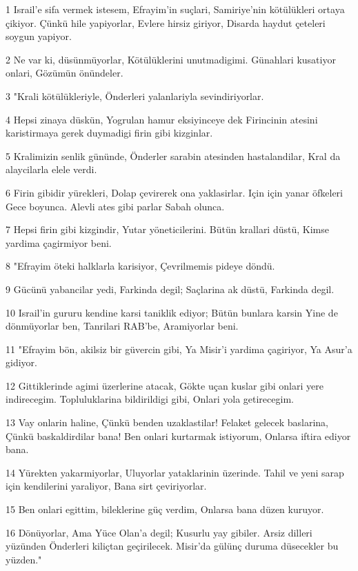 \par 1 Israil'e sifa vermek istesem, Efrayim'in suçlari, Samiriye'nin kötülükleri ortaya çikiyor. Çünkü hile yapiyorlar, Evlere hirsiz giriyor, Disarda haydut çeteleri soygun yapiyor.
\par 2 Ne var ki, düsünmüyorlar, Kötülüklerini unutmadigimi. Günahlari kusatiyor onlari, Gözümün önündeler.
\par 3 "Krali kötülükleriyle, Önderleri yalanlariyla sevindiriyorlar.
\par 4 Hepsi zinaya düskün, Yogrulan hamur eksiyinceye dek Firincinin atesini karistirmaya gerek duymadigi firin gibi kizginlar.
\par 5 Kralimizin senlik gününde, Önderler sarabin atesinden hastalandilar, Kral da alaycilarla elele verdi.
\par 6 Firin gibidir yürekleri, Dolap çevirerek ona yaklasirlar. Için için yanar öfkeleri Gece boyunca. Alevli ates gibi parlar Sabah olunca.
\par 7 Hepsi firin gibi kizgindir, Yutar yöneticilerini. Bütün krallari düstü, Kimse yardima çagirmiyor beni.
\par 8 "Efrayim öteki halklarla karisiyor, Çevrilmemis pideye döndü.
\par 9 Gücünü yabancilar yedi, Farkinda degil; Saçlarina ak düstü, Farkinda degil.
\par 10 Israil'in gururu kendine karsi taniklik ediyor; Bütün bunlara karsin Yine de dönmüyorlar ben, Tanrilari RAB'be, Aramiyorlar beni.
\par 11 "Efrayim bön, akilsiz bir güvercin gibi, Ya Misir'i yardima çagiriyor, Ya Asur'a gidiyor.
\par 12 Gittiklerinde agimi üzerlerine atacak, Gökte uçan kuslar gibi onlari yere indirecegim. Topluluklarina bildirildigi gibi, Onlari yola getirecegim.
\par 13 Vay onlarin haline, Çünkü benden uzaklastilar! Felaket gelecek baslarina, Çünkü baskaldirdilar bana! Ben onlari kurtarmak istiyorum, Onlarsa iftira ediyor bana.
\par 14 Yürekten yakarmiyorlar, Uluyorlar yataklarinin üzerinde. Tahil ve yeni sarap için kendilerini yaraliyor, Bana sirt çeviriyorlar.
\par 15 Ben onlari egittim, bileklerine güç verdim, Onlarsa bana düzen kuruyor.
\par 16 Dönüyorlar, Ama Yüce Olan'a degil; Kusurlu yay gibiler. Arsiz dilleri yüzünden Önderleri kiliçtan geçirilecek. Misir'da gülünç duruma düsecekler bu yüzden."


